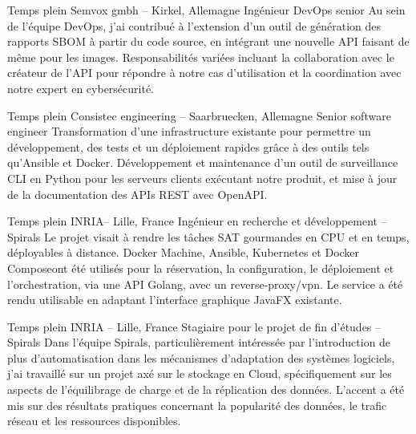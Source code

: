 \documentclass[10pt]{article} %
\begin{document}
\begin{paracol}{2}


{Temps plein} %
{Semvox gmbh -- Kirkel, Allemagne} %
{Ingénieur DevOps senior} %
{Au sein de l'équipe DevOps, j'ai contribué à l'extension d'un outil de génération des rapports SBOM à partir du code source, en intégrant une nouvelle API faisant de même pour les images. Responsabilités variées incluant la collaboration avec le créateur de l'API pour répondre à notre cas d'utilisation et la coordination avec notre expert en cybersécurité.} %


{Temps plein} %
{Consistec engineering -- Saarbruecken, Allemagne} %
{Senior software engineer} %
{Transformation d'une infrastructure existante pour permettre un développement, des tests et un déploiement rapides grâce à des outils tels qu'Ansible et Docker. Développement et maintenance d'un outil de surveillance CLI en Python pour les serveurs clients exécutant notre produit, et mise à jour de la documentation des APIs REST avec OpenAPI.} %


{Temps plein} %
{INRIA-- Lille, France} %
{Ingénieur en recherche et développement -- Spirals} %
{Le projet visait à rendre les tâches SAT gourmandes en CPU et en temps, déployables à distance. Docker Machine, Ansible, Kubernetes et Docker Composeont été utilisés pour la réservation, la configuration, le déploiement et l'orchestration, via une API Golang, avec un reverse-proxy/vpn. Le service a été rendu utilisable en adaptant l'interface graphique JavaFX existante.} %


\vspace{-\baselineskip}\medskip %

{Temps plein} %
{INRIA -- Lille, France} %
{Stagiaire pour le projet de fin d'études -- Spirals} %
{Dans l'équipe Spirals, particulièrement intéressée par l'introduction de plus d'automatisation dans les mécanismes d'adaptation des systèmes logiciels, j'ai travaillé sur un projet axé sur le stockage en Cloud, spécifiquement sur les aspects de l'équilibrage de charge et de la réplication des données. L'accent a été mis sur des résultats pratiques concernant la popularité des données, le trafic réseau et les ressources disponibles.} %


\end{paracol}
\end{document}
